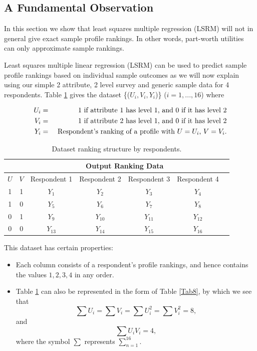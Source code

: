 \documentclass[a4paper, 12pt]{article}
\begin{document}
\subsection{A Fundamental Observation}
In this section we show that  least squares multiple  regression (LSRM) will not in general give exact sample profile rankings. In other words, part-worth utilities can only approximate sample rankings.


Least squares multiple linear regression (LSRM) can be used to predict sample profile rankings based on individual sample outcomes as we will now explain using our simple 2 attribute, 2 level survey and generic sample data for 4 respondents. Table \ref{Tab7} gives the dataset \{($U_i,V_i,Y_i$)\} ($i = 1,...,16$) where

\begin{eqnarray*}
	U_i&=& 1 \textup{ if attribute 1 has level 1, and 0 if it has level 2}\\
	V_i&=& 1 \textup{ if attribute 2 has level 1, and 0 if it has level 2}\\
	Y_i&=& \textup{ Respondent's ranking of a profile with $U=U_i$, $V=V_i$.}
\end{eqnarray*}

\begin{table}[!htpb]
	\centering
	\small
	\begin{tabular}{cc|ccccc}
		\multicolumn{2}{c}{} &\multicolumn{4}{c}{Output Ranking Data}\\\hline
		$U$ & $V$ & Respondent 1&  Respondent 2& Respondent 3& Respondent 4\\  \hline
		1 &1&$Y_1$&$Y_2$&$Y_3$&$Y_4$\\
		1 &0&$Y_5$&$Y_6$&$Y_7$&$Y_8$ \\
		0 &1&$Y_9$&$Y_{10}$&$Y_{11}$&$Y_{12}$ \\
		0 &0&$Y_{13}$&$Y_{14}$&$Y_{15}$&$Y_{16}$ \\\hline
	\end{tabular}
	\caption{{\small Dataset ranking structure by respondents.}}
	\label{Tab7}
\end{table}


This dataset has certain properties:
\begin{itemize}
	\item
	Each column consists of a respondent's profile rankings, and hence contains the values $1, 2, 3, 4$ in any order.
	
	\item
	Table \ref{Tab7} can also be represented in the form of Table \ref{Tab8}, by which we see that $$\sum U_i = \sum V_i = \sum U_i^2 = \sum V_i^2= 8, $$ and $$ \sum U_iV_i = 4,$$ where the symbol $\sum $ represents $\displaystyle \sum_{n=1}^{16}$.
\end{itemize}
\end{document}
